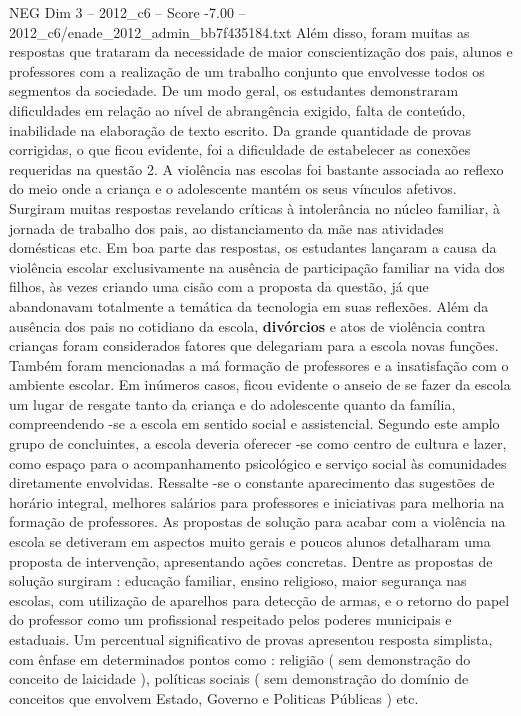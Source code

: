 \begin{textsample}{NEG Dim 3 – 2012\_c6 – Score -7.00 – 2012\_c6/enade\_2012\_admin\_bb7f435184.txt}
Além disso, foram muitas as respostas que trataram da necessidade de maior conscientização dos pais, alunos e professores com a realização de um trabalho conjunto que envolvesse todos os segmentos da sociedade.
De um modo geral, os estudantes demonstraram dificuldades em relação ao nível de abrangência exigido, falta de conteúdo, inabilidade na elaboração de texto escrito.
Da grande quantidade de provas corrigidas, o que ficou evidente, foi a dificuldade de estabelecer as conexões requeridas na questão 2.
A violência nas escolas foi bastante associada ao reflexo do meio onde a criança e o adolescente mantém os seus vínculos afetivos.
Surgiram muitas respostas revelando críticas à intolerância no núcleo familiar, à jornada de trabalho dos pais, ao distanciamento da mãe nas atividades domésticas etc.
Em boa parte das respostas, os estudantes lançaram a causa da violência escolar exclusivamente na ausência de participação familiar na vida dos filhos, às vezes criando uma cisão com a proposta da questão, já que abandonavam totalmente a temática da tecnologia em suas reflexões.
Além da ausência dos pais no cotidiano da escola, \textbf{divórcios} e atos de violência contra crianças foram considerados fatores que delegariam para a escola novas funções.
Também foram mencionadas a má formação de professores e a insatisfação com o ambiente escolar.
Em inúmeros casos, ficou evidente o anseio de se fazer da escola um lugar de resgate tanto da criança e do adolescente quanto da família, compreendendo -se a escola em sentido social e assistencial.
Segundo este amplo grupo de concluintes, a escola deveria oferecer -se como centro de cultura e lazer, como espaço para o acompanhamento psicológico e serviço social às comunidades diretamente envolvidas.
Ressalte -se o constante aparecimento das sugestões de horário integral, melhores salários para professores e iniciativas para melhoria na formação de professores.
As propostas de solução para acabar com a violência na escola se detiveram em aspectos muito gerais e poucos alunos detalharam uma proposta de intervenção, apresentando ações concretas.
Dentre as propostas de solução surgiram : educação familiar, ensino religioso, maior segurança nas escolas, com utilização de aparelhos para detecção de armas, e o retorno do papel do professor como um profissional respeitado pelos poderes municipais e estaduais.
Um percentual significativo de provas apresentou resposta simplista, com ênfase em determinados pontos como : religião ( sem demonstração do conceito de laicidade ), políticas sociais ( sem demonstração do domínio de conceitos que envolvem Estado, Governo e Politicas Públicas ) etc.

\end{textsample}
